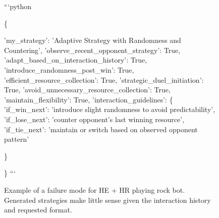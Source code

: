 \documentclass{article} %
\begin{document}
\begin{figure}[!t]
\begin{tcolorbox}[
title={\small \textbf{Example generated strategy for HE + HR playing rock bot}},
width=0.99\columnwidth]
```python

\{


    'my\_strategy': 'Adaptive Strategy with Randomness and Countering',
    'observe\_recent\_opponent\_strategy': True,
    'adapt\_based\_on\_interaction\_history': True,
    'introduce\_randomness\_post\_win': True,
    'efficient\_resource\_collection': True,
    'strategic\_duel\_initiation': True,
    'avoid\_unnecessary\_resource\_collection': True,
    'maintain\_flexibility': True,
    'interaction\_guidelines': \{
        'if\_win\_next': 'introduce slight randomness to avoid predictability',
        'if\_lose\_next': 'counter opponent’s last winning resource',
        'if\_tie\_next': 'maintain or switch based on observed opponent pattern'

        
    \}


\}
```
\end{tcolorbox}
\caption{
Example of a failure mode for HE + HR playing rock bot. Generated strategies make little sense given the interaction history and requested format.
\label{fig:fig9}
}
\end{figure}
\clearpage
\end{document}

